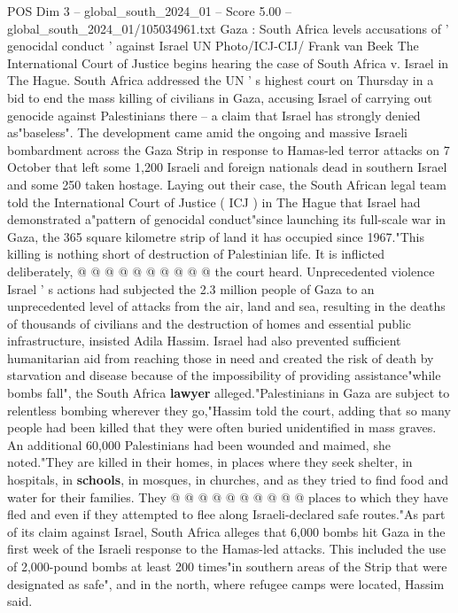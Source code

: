 \begin{textsample}{POS Dim 3 – global\_south\_2024\_01 – Score 5.00 – global\_south\_2024\_01/105034961.txt}  \label{ex:f3_pos_356}
Gaza : South Africa levels accusations of ' genocidal conduct ' against Israel UN Photo/ICJ-CIJ/ Frank van Beek The International Court of Justice begins hearing the case of South Africa v.
Israel in The Hague.
South Africa addressed the UN ' s highest court on Thursday in a bid to end the mass killing of civilians in Gaza, accusing Israel of carrying out genocide against Palestinians there -- a claim that Israel has strongly denied as"baseless".
The development came amid the ongoing and massive Israeli bombardment across the Gaza Strip in response to Hamas-led terror attacks on 7 October that left some 1,200 Israeli and foreign nationals dead in southern Israel and some 250 taken hostage.
Laying out their case, the South African legal team told the International Court of Justice ( ICJ ) in The Hague that Israel had demonstrated a"pattern of genocidal conduct"since launching its full-scale war in Gaza, the 365 square kilometre strip of land it has occupied since 1967."This killing is nothing short of destruction of Palestinian life.
It is inflicted deliberately, @ @ @ @ @ @ @ @ @ @ the court heard.
Unprecedented violence Israel ' s actions had subjected the 2.3 million people of Gaza to an unprecedented level of attacks from the air, land and sea, resulting in the deaths of thousands of civilians and the destruction of homes and essential public infrastructure, insisted Adila Hassim.
Israel had also prevented sufficient humanitarian aid from reaching those in need and created the risk of death by starvation and disease because of the impossibility of providing assistance"while bombs fall", the South Africa \textbf{lawyer} alleged."Palestinians in Gaza are subject to relentless bombing wherever they go,"Hassim told the court, adding that so many people had been killed that they were often buried unidentified in mass graves.
An additional 60,000 Palestinians had been wounded and maimed, she noted."They are killed in their homes, in places where they seek shelter, in hospitals, in \textbf{schools}, in mosques, in churches, and as they tried to find food and water for their families.
They @ @ @ @ @ @ @ @ @ @ places to which they have fled and even if they attempted to flee along Israeli-declared safe routes."As part of its claim against Israel, South Africa alleges that 6,000 bombs hit Gaza in the first week of the Israeli response to the Hamas-led attacks.
This included the use of 2,000-pound bombs at least 200 times"in southern areas of the Strip that were designated as safe", and in the north, where refugee camps were located, Hassim said.

\end{textsample}
